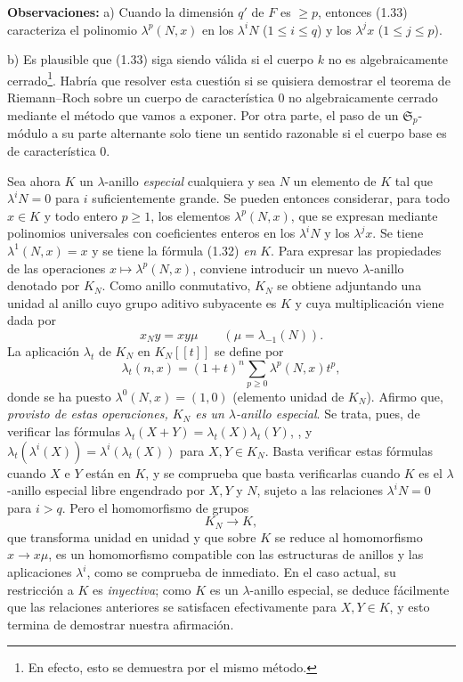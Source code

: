 \textbf{Observaciones:} a) Cuando la dimensión $q'$ de $F$ es $\geq p$, entonces (1.33) caracteriza el polinomio $\lambda^p(N,x)$ en los $\lambda^iN$ ($1\leq i\leq q$) y los $\lambda^jx$ ($1\leq j\leq p$).

b) Es plausible que (1.33) siga siendo válida si el cuerpo $k$ no es algebraicamente cerrado\footnote{En efecto, esto se demuestra por el mismo método.}. Habría que resolver esta cuestión si se quisiera demostrar el teorema de Riemann--Roch sobre un cuerpo de característica $0$ no algebraicamente cerrado mediante el método que vamos a exponer. Por otra parte, el paso de un $\mathfrak S_p$-módulo a su parte alternante solo tiene un sentido razonable si el cuerpo base es de característica $0$.

Sea ahora $K$ un $\lambda$-anillo \emph{especial} cualquiera y sea $N$ un elemento de $K$ tal que $\lambda^iN=0$ para $i$ suficientemente grande. Se pueden entonces considerar, para todo $x\in K$ y todo entero $p\geq1$, los elementos $\lambda^p(N,x)$, que se expresan mediante polinomios universales con coeficientes enteros en los $\lambda^iN$ y los $\lambda^jx$. Se tiene $\lambda^1(N,x)=x$ y se tiene la fórmula (1.32) \emph{en} $K$. Para expresar las propiedades de las operaciones $x\mapsto\lambda^p(N,x)$, conviene introducir un nuevo $\lambda$-anillo denotado por $K_N$. Como anillo conmutativo, $K_N$ se obtiene adjuntando una unidad al anillo cuyo grupo aditivo subyacente es $K$ y cuya multiplicación viene dada por
\begin{equation}\tag{1.34}
x_Ny=xy\mu\qquad (\mu=\lambda_{-1}(N)).
\end{equation}
La aplicación $\lambda_t$ de $K_N$ en $K_N[[t]]$ se define por
\begin{equation}\tag{1.35}
\lambda_t(n,x)=(1+t)^n\sum_{p\geq0}\lambda^p(N,x)t^p,
\end{equation}
donde se ha puesto $\lambda^0(N,x)=(1,0)$ (elemento unidad de $K_N$). Afirmo que, \emph{provisto de estas operaciones, $K_N$ es un $\lambda$-anillo especial}. Se trata, pues, de verificar las fórmulas $\lambda_t(X+Y)=\lambda_t(X)\lambda_t(Y)$, , y $\lambda_t(\lambda^i(X))=\lambda^i(\lambda_t(X))$ para $X,Y\in K_N$. Basta verificar estas fórmulas cuando $X$ e $Y$ están en $K$, y se comprueba que basta verificarlas cuando $K$ es el $\lambda$-anillo especial libre engendrado por $X,Y$ y $N$, sujeto a las relaciones $\lambda^iN=0$ para $i>q$. Pero el homomorfismo de grupos
\begin{equation}\tag{1.36}
K_N\longrightarrow K,
\end{equation}
que transforma unidad en unidad y que sobre $K$ se reduce al homomorfismo $x\longrightarrow x\mu$, es un homomorfismo compatible con las estructuras de anillos y las aplicaciones $\lambda^i$, como se comprueba de inmediato. En el caso actual, su restricción a $K$ es \emph{inyectiva}; como $K$ es un $\lambda$-anillo especial, se deduce fácilmente que las relaciones anteriores se satisfacen efectivamente para $X,Y\in K$, y esto termina de demostrar nuestra afirmación.

